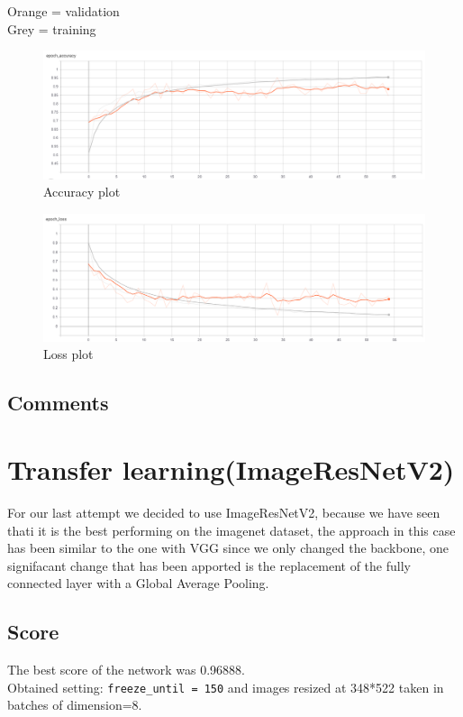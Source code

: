 \documentclass[12pt,a4paper]{report}
\begin{document}
		Orange = validation\\
		Grey = training
		\begin{figure}[H]
			\includegraphics[scale = 0.6, center]{vgg accuracy}
			\caption{Accuracy plot}
		\end{figure}
		\begin{figure}[H]
			\includegraphics[scale = 0.6, center]{vgg loss}
			\caption{Loss plot}
		\end{figure}
		\subsection{Comments}

\section{Transfer learning(ImageResNetV2)}
For our last attempt we decided to use ImageResNetV2, because we have seen thati it is the best performing on the imagenet dataset, the approach in this case has been similar to the one with VGG since we only changed the backbone, one signifacant change that has been apported is the replacement of the fully connected layer with a Global Average Pooling.
\subsection{Score}
	The best score of the network was 0.96888.\\
Obtained setting: \texttt{freeze\_until = 150} and images resized at 348*522 taken in batches of dimension=8.
\end{document}
